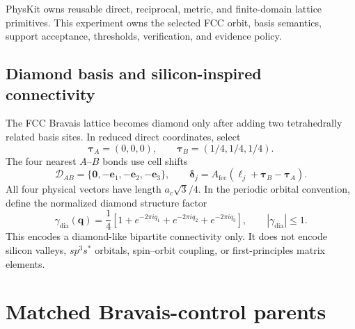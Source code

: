 \documentclass[11pt]{article}
\begin{document}
PhysKit owns reusable direct, reciprocal, metric, and finite-domain lattice primitives.
This experiment owns the selected FCC orbit, basis semantics, support acceptance,
thresholds, verification, and evidence policy.

\subsection{Diamond basis and silicon-inspired connectivity}

The FCC Bravais lattice becomes diamond only after adding two tetrahedrally related
basis sites.  In reduced direct coordinates, select
\begin{equation}
 \boldsymbol\tau_A=(0,0,0),
 \qquad
 \boldsymbol\tau_B=(1/4,1/4,1/4).
 \label{eq:diamond-basis}
\end{equation}
The four nearest $A$--$B$ bonds use cell shifts
\begin{equation}
 \mathcal D_{AB}=\{\mathbf0,-\mathbf e_1,-\mathbf e_2,-\mathbf e_3\},
 \qquad
 \boldsymbol\delta_j=A_{\mathrm{fcc}}
 (\boldsymbol\ell_j+\boldsymbol\tau_B-\boldsymbol\tau_A).
 \label{eq:diamond-bonds}
\end{equation}
All four physical vectors have length $a_c\sqrt3/4$.  In the periodic orbital
convention, define the normalized diamond structure factor
\begin{equation}
 \gamma_{\mathrm{dia}}(\mathbf q)
 =\frac14\left[1+e^{-2\pi iq_1}+e^{-2\pi iq_2}+e^{-2\pi iq_3}\right],
 \qquad |\gamma_{\mathrm{dia}}|\le1.
 \label{eq:diamond-structure-factor}
\end{equation}
This encodes a diamond-like bipartite connectivity only.  It does not encode silicon
valleys, $sp^3s^*$ orbitals, spin--orbit coupling, or first-principles matrix elements.

\section{Matched Bravais-control parents}
\end{document}
